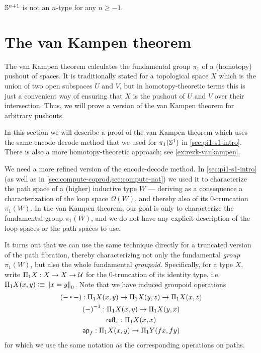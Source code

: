 \begin{cor}
  $\Sn^{n+1}$ is not an $n$-type for any $n\ge -1$.
\end{cor}

\section{The van Kampen theorem}
\label{sec:van-kampen}

The van Kampen theorem calculates the fundamental group $\pi_1$ of a (homotopy) pushout of spaces.
It is traditionally stated for a topological space $X$ which is the union of two open subspaces $U$ and $V$, but in homotopy-theoretic terms this is just a convenient way of ensuring that $X$ is the pushout of $U$ and $V$ over their intersection.
Thus, we will prove a version of the van Kampen theorem for arbitrary pushouts.

In this section we will describe a proof of the van Kampen theorem which uses the same encode-decode method that we used for $\pi_1(\Sn^1)$ in \autoref{sec:pi1-s1-intro}.
There is also a more homotopy-theoretic approach; see \autoref{ex:rezk-vankampen}.

We need a more refined version of the encode-decode method.
In \autoref{sec:pi1-s1-intro} (as well as in \autoref{sec:compute-coprod,sec:compute-nat}) we used it to characterize the path space of a (higher) inductive type $W$ --- deriving as a consequence a characterization of the loop space $\Omega(W)$, and thereby also of its 0-truncation $\pi_1(W)$.
In the van Kampen theorem, our goal is only to characterize the fundamental group $\pi_1(W)$, and we do not have any explicit description of the loop spaces or the path spaces to use.

It turns out that we can use the same technique directly for a truncated version of the path fibration, thereby characterizing not only the fundamental \emph{group} $\pi_1(W)$, but also the whole fundamental \emph{groupoid}.
Specifically, for a type $X$, write $\Pi_1 X: X\to X\to \type$ for the $0$-truncation of its identity type, i.e.\ $\Pi_1 X(x,y) \defeq \trunc0{x=y}$.
Note that we have induced groupoid operations
\begin{gather*}
  (-\ct-) : \Pi_1X(x,y) \to \Pi_1X(y,z) \to \Pi_1X(x,z)\\
  \opp{(-)} : \Pi_1X(x,y) \to \Pi_1X(y,x)\\
  \refl{x} : \Pi_1X(x,x)\\
  \apfunc{f} : \Pi_1X(x,y) \to \Pi_1Y(fx,fy)
\end{gather*}
for which we use the same notation as the corresponding operations on paths.

